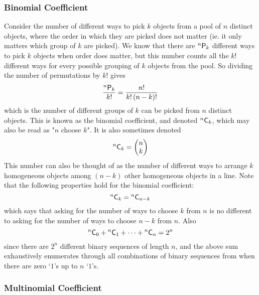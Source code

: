 \documentclass[11pt]{report} %
\begin{document}
\subsubsection{Binomial Coefficient}

Consider the number of different ways to pick $k$ objects from a pool of $n$ distinct objects, where the order in which they are picked does not matter (ie. it only matters which group of $k$ are picked). We know that there are $\mathstrut^{n}\mathsf{P}_{k}$ different ways to pick $k$ objects when order does matter, but this number counts all the $k!$ different ways for every possible grouping of $k$ objects from the pool. So dividing the number of permutations by $k!$ gives
\begin{equation}
\dfrac{\mathstrut^{n}\mathsf{P}_{k}}{k!} = \dfrac{n!}{k!\left(n - k\right)!}
\end{equation}
which is the number of different groups of $k$ can be picked from $n$ distinct objects. This is known as the binomial coefficient, and denoted $\mathstrut^{n}\mathsf{C}_{k}$, which may also be read as "$n$ choose $k$". It is also sometimes denoted
\begin{equation}
\mathstrut^{n}\mathsf{C}_{k} = \begin{pmatrix}n\\k\end{pmatrix}
\end{equation}
This number can also be thought of as the number of different ways to arrange $k$ homogeneous objects among $\left(n - k\right)$ other homogeneous objects in a line. Note that the following properties hold for the binomial coefficient:
\begin{equation}
\mathstrut^{n}\mathsf{C}_{k} = \mathstrut^{n}\mathsf{C}_{n - k}
\end{equation}
which says that asking for the number of ways to choose $k$ from $n$ is no different to asking for the number of ways to choose $n - k$ from $n$. Also
\begin{equation}
\mathstrut^{n}\mathsf{C}_{0} + \mathstrut^{n}\mathsf{C}_{1} + \dots + \mathstrut^{n}\mathsf{C}_{n} = 2^{n}
\end{equation}
since there are $2^{n}$ different binary sequences of length $n$, and the above sum exhaustively enumerates through all combinations of binary sequences from when there are zero `$1$'s up to $n$ `$1$'s.

\subsubsection{Multinomial Coefficient}
\end{document}
